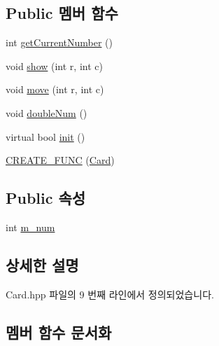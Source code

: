 \subsection*{Public 멤버 함수}
\begin{DoxyCompactItemize}
\item 
int \hyperlink{class_code_lady_j_j_y_1_1game2048_1_1_card_a7c8da9286db22bb16cfa0f8502b41eb4}{get\+Current\+Number} ()
\item 
void \hyperlink{class_code_lady_j_j_y_1_1game2048_1_1_card_abd3f3208867d1450ba4eeef3cef62d3f}{show} (int r, int c)
\item 
void \hyperlink{class_code_lady_j_j_y_1_1game2048_1_1_card_a6ad341b10626a9cc1aafe8229fa61ea6}{move} (int r, int c)
\item 
void \hyperlink{class_code_lady_j_j_y_1_1game2048_1_1_card_ad4cae75359815f3d80db488df3fd3dfd}{double\+Num} ()
\item 
virtual bool \hyperlink{class_code_lady_j_j_y_1_1game2048_1_1_card_a5efe85fbf1117b9a64cc13311352284c}{init} ()
\item 
\hyperlink{class_code_lady_j_j_y_1_1game2048_1_1_card_aeef08b192f5d93d6852ebfb75bb9bd9a}{C\+R\+E\+A\+T\+E\+\_\+\+F\+U\+NC} (\hyperlink{class_code_lady_j_j_y_1_1game2048_1_1_card}{Card})
\end{DoxyCompactItemize}
\subsection*{Public 속성}
\begin{DoxyCompactItemize}
\item 
int \hyperlink{class_code_lady_j_j_y_1_1game2048_1_1_card_ae612aaa37e50cb81d6f8ddb7283ebcbc}{m\+\_\+num}
\end{DoxyCompactItemize}


\subsection{상세한 설명}


Card.\+hpp 파일의 9 번째 라인에서 정의되었습니다.



\subsection{멤버 함수 문서화}
\mbox{\label{class_code_lady_j_j_y_1_1game2048_1_1_card_aeef08b192f5d93d6852ebfb75bb9bd9a}} 
